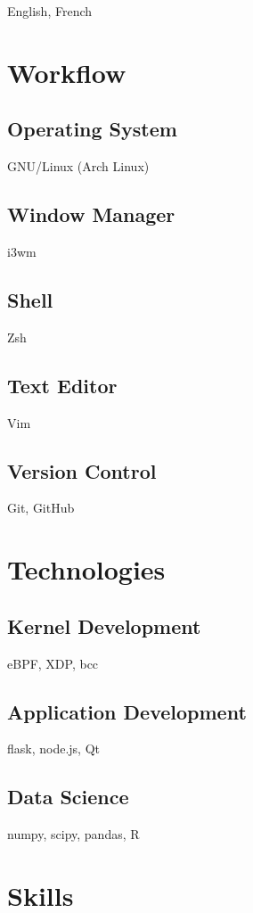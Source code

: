 \documentclass[
    10pt,
]
{article}
\begin{document}
\begin{figure}
\begin{minipage}[t]{0.32\textwidth}
English, French

\section{Workflow}

\subsection{Operating System}
GNU/Linux (Arch Linux)

\subsection{Window Manager}
i3wm

\subsection{Shell}
Zsh

\subsection{Text Editor}
Vim

\subsection{Version Control}
Git, GitHub

\section{Technologies}
\vspace{0.5em}
\subsection{Kernel Development}
eBPF, XDP, bcc
\subsection{Application Development}
flask, node.js, Qt
\subsection{Data Science}
numpy, scipy, pandas, R

\section{Skills}
\vspace{0.5em}

\end{minipage}
\end{figure}
\end{document}
